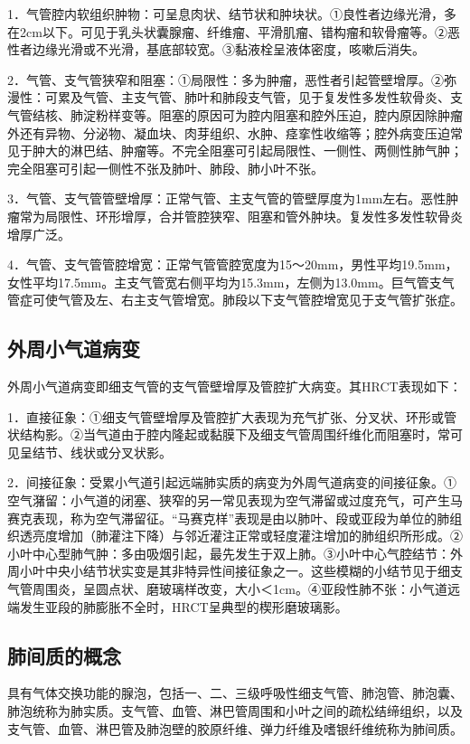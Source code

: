 1．气管腔内软组织肿物：可呈息肉状、结节状和肿块状。①良性者边缘光滑，多在2cm以下。可见于乳头状囊腺瘤、纤维瘤、平滑肌瘤、错构瘤和软骨瘤等。②恶性者边缘光滑或不光滑，基底部较宽。③黏液栓呈液体密度，咳嗽后消失。

2．气管、支气管狭窄和阻塞：①局限性：多为肿瘤，恶性者引起管壁增厚。②弥漫性：可累及气管、主支气管、肺叶和肺段支气管，见于复发性多发性软骨炎、支气管结核、肺淀粉样变等。阻塞的原因可为腔内阻塞和腔外压迫，腔内原因除肿瘤外还有异物、分泌物、凝血块、肉芽组织、水肿、痉挛性收缩等；腔外病变压迫常见于肿大的淋巴结、肿瘤等。不完全阻塞可引起局限性、一侧性、两侧性肺气肿；完全阻塞可引起一侧性不张及肺叶、肺段、肺小叶不张。

3．气管、支气管管壁增厚：正常气管、主支气管的管壁厚度为1mm左右。恶性肿瘤常为局限性、环形增厚，合并管腔狭窄、阻塞和管外肿块。复发性多发性软骨炎增厚广泛。

4．气管、支气管管腔增宽：正常气管管腔宽度为15～20mm，男性平均19.5mm，女性平均17.5mm。主支气管宽右侧平均为15.3mm，左侧为13.0mm。巨气管支气管症可使气管及左、右主支气管增宽。肺段以下支气管腔增宽见于支气管扩张症。

\subsection{外周小气道病变}

外周小气道病变即细支气管的支气管壁增厚及管腔扩大病变。其HRCT表现如下：

1．直接征象：①细支气管壁增厚及管腔扩大表现为充气扩张、分叉状、环形或管状结构影。②当气道由于腔内隆起或黏膜下及细支气管周围纤维化而阻塞时，常可见呈结节、线状或分叉状影。

2．间接征象：受累小气道引起远端肺实质的病变为外周气道病变的间接征象。①空气潴留：小气道的闭塞、狭窄的另一常见表现为空气滞留或过度充气，可产生马赛克表现，称为空气滞留征。“马赛克样”表现是由以肺叶、段或亚段为单位的肺组织透亮度增加（肺灌注下降）与邻近灌注正常或轻度灌注增加的肺组织所形成。②小叶中心型肺气肿：多由吸烟引起，最先发生于双上肺。③小叶中心气腔结节：外周小叶中央小结节状实变是其非特异性间接征象之一。这些模糊的小结节见于细支气管周围炎，呈圆点状、磨玻璃样改变，大小＜1cm。④亚段性肺不张：小气道远端发生亚段的肺膨胀不全时，HRCT呈典型的楔形磨玻璃影。

\subsection{肺间质的概念}

具有气体交换功能的腺泡，包括一、二、三级呼吸性细支气管、肺泡管、肺泡囊、肺泡统称为肺实质。支气管、血管、淋巴管周围和小叶之间的疏松结缔组织，以及支气管、血管、淋巴管及肺泡壁的胶原纤维、弹力纤维及嗜银纤维统称为肺间质。

